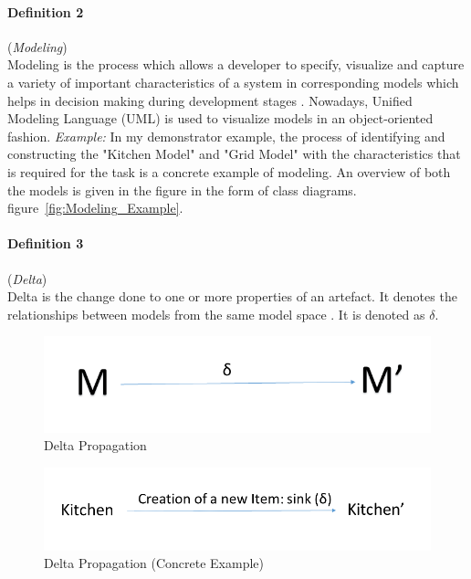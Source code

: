\paragraph{Definition 2} (\textit{Modeling})\\
Modeling is the process which allows a developer to specify, visualize and capture a variety of important characteristics of a system in corresponding models which helps in decision making during development stages \cite{uml}. Nowadays, Unified Modeling Language (UML) \cite{uml} is used to visualize models in an object-oriented fashion.
\newline\newline\textit{Example:} In my demonstrator example, the process of identifying and constructing the "Kitchen Model" and "Grid Model" with the characteristics that is required for the task is a concrete example of modeling. An overview of both the models is given in the figure in the form of class diagrams. figure~\ref{fig:Modeling_Example}.

\paragraph{Definition 3} (\textit{Delta})\\ 
Delta is the change done to one or more properties of an artefact. It denotes the relationships between models from the same model space \cite{benchmarx-reload}. It is denoted as $\delta$.
\begin{figure}
	\includegraphics[width=1\textwidth]{figures/Delta}
	\caption{Delta Propagation}
	\label{fig:Delta_Propagation}
\end{figure}

\begin{figure}
	\includegraphics[width=1\textwidth]{figures/Delta_Concrete}
	\caption{Delta Propagation (Concrete Example)}
	\label{fig:Delta_Propagation_Concrete}
\end{figure}


